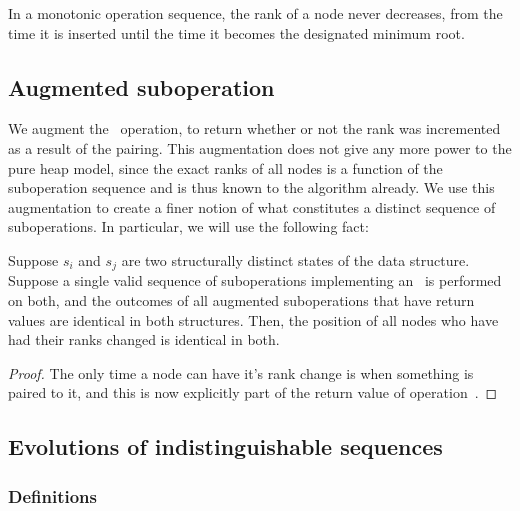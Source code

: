 \begin{obs}
In a monotonic operation sequence, the rank of a node never decreases, from the time it is inserted until the time it becomes the designated minimum root.
\end{obs}






\subsection{Augmented suboperation} 


We augment  the \cdot\ operation, to return whether or not the rank was incremented as a result of the pairing. This augmentation does not give any more power to the pure heap model, since the exact ranks of all nodes is a function of the suboperation sequence and is thus known to the algorithm already.
We use this augmentation to create a finer notion of what constitutes a distinct sequence of suboperations. In particular, we will use the following fact:

\begin{lemma} 
Suppose $s_i$ and $s_j$ are two structurally distinct states of the data structure. Suppose a single valid sequence of suboperations implementing an \opEm\ is performed on both, and the outcomes of all augmented suboperations that have return values are identical in both structures. Then, the position of all nodes who have had their ranks changed is identical in both.
\end{lemma}

\begin{fullonly}
\begin{proof}
The only time a node can have it's rank change is when something is paired to it, and this is now explicitly part of the return value of operation~.
\end{proof}
\end{fullonly}



\subsection{Evolutions of indistinguishable sequences} 

\subsubsection{Definitions} 

